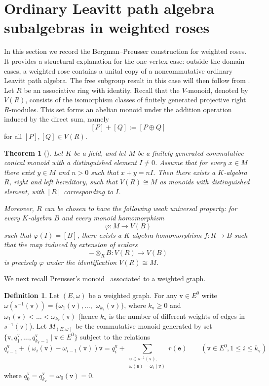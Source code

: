 \documentclass{article}
\newtheorem{theorem}{Theorem}
\theoremstyle{definition}
\newtheorem{definition}{Definition}
\begin{document}
\section{Ordinary Leavitt path algebra subalgebras in weighted roses}
In this section we record the Bergman--Preusser construction for weighted roses. It provides a structural explanation for the one-vertex case: outside the domain cases, a weighted rose contains a unital copy of a noncommutative ordinary Leavitt path algebra. The free subgroup result in this case will then follow from \cite{HK}. Let $R$ be an associative ring with identity. Recall that the $V$-monoid, denoted by $V(R)$, consists of the isomorphism classes of finitely generated projective right $R$-modules. This set forms an abelian monoid under the addition operation induced by the direct sum, namely 
$$
[P] + [Q] := [P \oplus Q]
$$
for all $[P], [Q] \in V(R)$.

\begin{theorem}[{\cite[Theorem~6.2]{B}}]\label{thm:Bergman-6.2-corrected}
Let $K$ be a field, and let $M$ be a finitely generated commutative conical monoid with a distinguished element $I\neq 0$. Assume that for every $x\in M$ there exist $y\in M$ and $n>0$ such that $x+y=nI$.
Then there exists a $K$-algebra $R$, right and left hereditary, such that $V(R)\cong M$ as monoids with distinguished element, with $[R]$ corresponding to $I$.

Moreover, $R$ can be chosen to have the following weak universal property: for every $K$-algebra $B$ and every monoid homomorphism
$$
\varphi:M\to V(B)
$$
such that $\varphi(I)=[B]$, there exists a $K$-algebra homomorphism $f:R\to B$ such that the map induced by extension of scalars
$$
-\otimes_R B:V(R)\to V(B)
$$
is precisely $\varphi$ under the identification $V(R)\cong M$. 
\end{theorem}
We next recall Preusser's monoid~\cite{Pre4,Pre1} associated to a weighted graph. 
\begin{definition}\label{defM}
Let $(E,\omega)$ be a weighted graph. For any $\mathtt{v}\in E^0$ write $\omega(s^{-1}(\mathtt{v}))=\{\omega_1(\mathtt{v}),\dots,$ $\omega_{k_{\mathtt{v}}}(\mathtt{v})\}$, where $k_{\mathtt{v}}\geq 0$ and $\omega_1(\mathtt{v})<\dots<\omega_{k_{\mathtt{v}}}(\mathtt{v})$ (hence $k_{\mathtt{v}}$ is the number of different weights of edges in $s^{-1}(\mathtt{v})$). Let $M_{(E,\omega)}$ be the commutative monoid generated by set $\{\mathtt{v},q_1^{\mathtt{v}},\dots,q^{\mathtt{v}}_{k_{\mathtt{v}}-1}\mid \mathtt{v}\in E^0\}$ subject to the relations 
\begin{equation}\label{monrel}
q^{\mathtt{v}}_{i-1}+(\omega_i(\mathtt{v})-\omega_{i-1}(\mathtt{v}))\mathtt{v}=q_i^{\mathtt{v}}+\sum_{\substack{\mathtt{e}\in s^{-1}(\mathtt{v}),\\\omega(\mathtt{e})=\omega_i(\mathtt{v})}}r(\mathtt{e})\quad\quad(\mathtt{v}\in E^0,1\leq i\leq k_{\mathtt{v}})
\end{equation}
where $q^{\mathtt{v}}_0=q^{\mathtt{v}}_{k_{\mathtt{v}}}=\omega_0(\mathtt{v})=0$. 
\end{definition}
\end{document}
